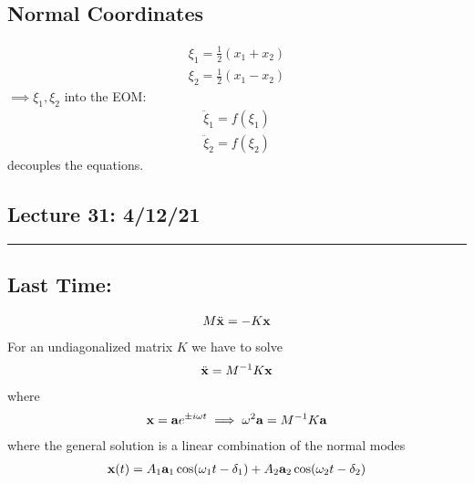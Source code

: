 \documentclass[../main.tex]{subfiles}
\begin{document}
\subsection*{Normal Coordinates}
\begin{align*}
    \xi_1 = \frac{1}{2} (x_1 + x_2) \\
    \xi_2 = \frac{1}{2} (x_1 - x_2)
\end{align*}
$\implies \xi_1, \xi_2$ into the EOM:
\begin{align*}
    \ddot \xi_1 = f(\xi_1) \\
    \ddot \xi_2 = f(\xi_2)
\end{align*} 
decouples the equations.

\newpage
\subsection*{Lecture 31: \hfill 4/12/21}
\hrule \vspace{10px}
\subsection*{Last Time:}
\begin{align*}
    M \ddot{\vb x} = - K \vb x
\end{align*}
For an undiagonalized matrix $K$ we have to solve
\begin{align*}
    \ddot{\vb x} = M^{-1} K \vb x
\end{align*}
where
\begin{align*}
    \vb x = \vb a e^{\pm i \omega t} \implies \omega^2 \vb a = M^{-1} K \vb a
\end{align*}
where the general solution is a linear combination of the normal modes
\begin{align*}
    \vb x(t) = A_1 \vb a_1 \cos(\omega_1 t - \delta_1) + A_2 \vb a_2 \cos(\omega_2 t - \delta_2)
\end{align*}
\end{document}
